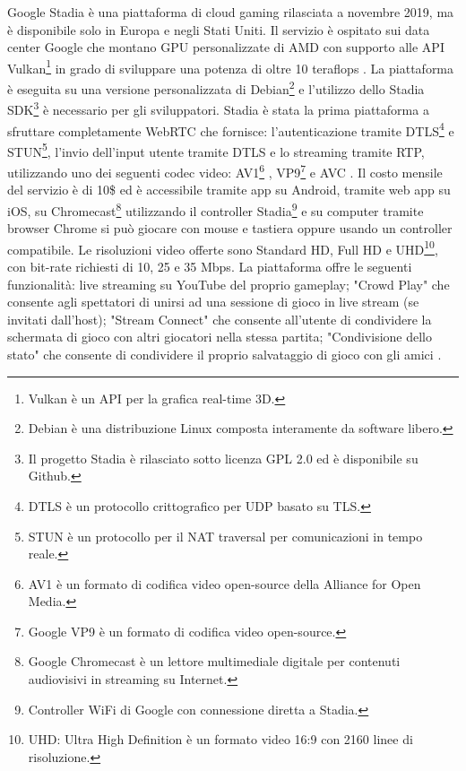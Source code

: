 Google Stadia è una piattaforma di cloud gaming rilasciata a novembre 2019, ma è disponibile solo in Europa e negli Stati Uniti. Il servizio è ospitato sui data center Google che montano GPU personalizzate di AMD \parencite{Google_Stadia_GPU} con supporto alle API Vulkan\footnote{Vulkan è un API per la grafica real-time 3D.} in grado di sviluppare una potenza di oltre 10 teraflops \parencite{Google_Stadia_Server}. La piattaforma è eseguita su una versione personalizzata di Debian\footnote{Debian è una distribuzione Linux composta interamente da software libero.} e l'utilizzo dello Stadia SDK\footnote{Il progetto Stadia è rilasciato sotto licenza GPL 2.0 ed è disponibile su Github.} è necessario per gli sviluppatori. Stadia è stata la prima piattaforma a sfruttare completamente WebRTC che fornisce: l'autenticazione tramite DTLS\footnote{DTLS è un protocollo crittografico per UDP basato su TLS.} e STUN\footnote{STUN è un protocollo per il NAT traversal per comunicazioni in tempo reale.}, l'invio dell'input utente tramite DTLS e lo streaming tramite RTP, utilizzando uno dei seguenti codec video: AV1\footnote{AV1 è un formato di codifica video open-source della Alliance for Open Media.} , VP9\footnote{Google VP9 è un formato di codifica video open-source.} e AVC \parencite{A_Network_Analysis_on_Cloud_Gaming_Stadia_GeForce_Now_and_PSNow}. Il costo mensile del servizio è di 10\$ ed è accessibile tramite app su Android, tramite web app su iOS, su Chromecast\footnote{Google Chromecast è un lettore multimediale digitale per contenuti audiovisivi in streaming su Internet.} utilizzando il controller Stadia\footnote{Controller WiFi di Google con connessione diretta a Stadia.} e su computer tramite browser Chrome si può giocare con mouse e tastiera oppure usando un controller compatibile. Le risoluzioni video offerte sono Standard HD, Full HD e UHD\footnote{UHD: Ultra High Definition è un formato video 16:9 con 2160 linee di risoluzione.}, con bit-rate richiesti di 10, 25 e 35 Mbps. La piattaforma offre le seguenti funzionalità: live streaming su YouTube del proprio gameplay; "Crowd Play" che consente agli spettatori di unirsi ad una sessione di gioco in live stream (se invitati dall'host); "Stream Connect" che consente all'utente di condividere la schermata di gioco con altri giocatori nella stessa partita; "Condivisione dello stato" che consente di condividere il proprio salvataggio di gioco con gli amici \parencite{Google_Stadia}.

